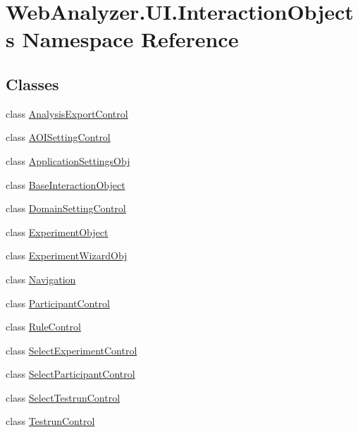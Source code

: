 \hypertarget{namespace_web_analyzer_1_1_u_i_1_1_interaction_objects}{}\section{Web\+Analyzer.\+U\+I.\+Interaction\+Objects Namespace Reference}
\label{namespace_web_analyzer_1_1_u_i_1_1_interaction_objects}
\subsection*{Classes}
\begin{DoxyCompactItemize}
\item 
class \hyperlink{class_web_analyzer_1_1_u_i_1_1_interaction_objects_1_1_analysis_export_control}{Analysis\+Export\+Control}
\item 
class \hyperlink{class_web_analyzer_1_1_u_i_1_1_interaction_objects_1_1_a_o_i_setting_control}{A\+O\+I\+Setting\+Control}
\item 
class \hyperlink{class_web_analyzer_1_1_u_i_1_1_interaction_objects_1_1_application_settings_obj}{Application\+Settings\+Obj}
\item 
class \hyperlink{class_web_analyzer_1_1_u_i_1_1_interaction_objects_1_1_base_interaction_object}{Base\+Interaction\+Object}
\item 
class \hyperlink{class_web_analyzer_1_1_u_i_1_1_interaction_objects_1_1_domain_setting_control}{Domain\+Setting\+Control}
\item 
class \hyperlink{class_web_analyzer_1_1_u_i_1_1_interaction_objects_1_1_experiment_object}{Experiment\+Object}
\item 
class \hyperlink{class_web_analyzer_1_1_u_i_1_1_interaction_objects_1_1_experiment_wizard_obj}{Experiment\+Wizard\+Obj}
\item 
class \hyperlink{class_web_analyzer_1_1_u_i_1_1_interaction_objects_1_1_navigation}{Navigation}
\item 
class \hyperlink{class_web_analyzer_1_1_u_i_1_1_interaction_objects_1_1_participant_control}{Participant\+Control}
\item 
class \hyperlink{class_web_analyzer_1_1_u_i_1_1_interaction_objects_1_1_rule_control}{Rule\+Control}
\item 
class \hyperlink{class_web_analyzer_1_1_u_i_1_1_interaction_objects_1_1_select_experiment_control}{Select\+Experiment\+Control}
\item 
class \hyperlink{class_web_analyzer_1_1_u_i_1_1_interaction_objects_1_1_select_participant_control}{Select\+Participant\+Control}
\item 
class \hyperlink{class_web_analyzer_1_1_u_i_1_1_interaction_objects_1_1_select_testrun_control}{Select\+Testrun\+Control}
\item 
class \hyperlink{class_web_analyzer_1_1_u_i_1_1_interaction_objects_1_1_testrun_control}{Testrun\+Control}
\end{DoxyCompactItemize}
